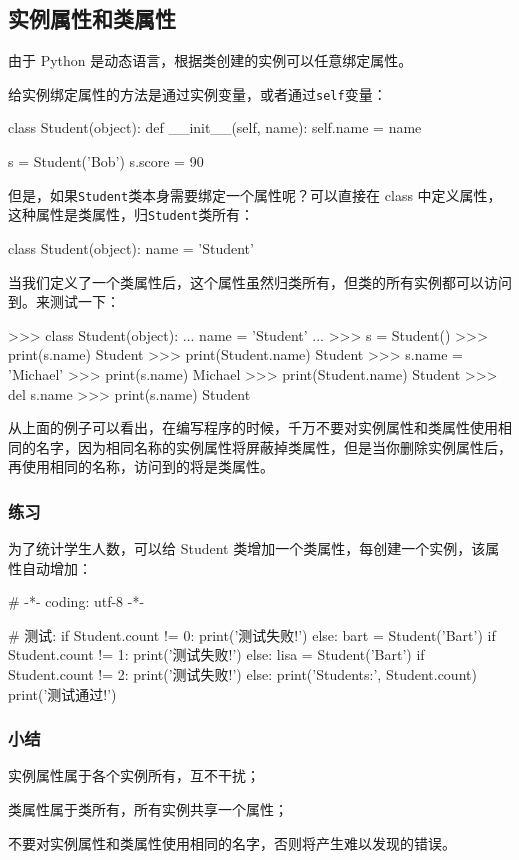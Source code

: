 \hypertarget{ux5b9eux4f8bux5c5eux6027ux548cux7c7bux5c5eux6027}{%
\subsection{实例属性和类属性}\label{ux5b9eux4f8bux5c5eux6027ux548cux7c7bux5c5eux6027}}

由于 Python 是动态语言，根据类创建的实例可以任意绑定属性。

给实例绑定属性的方法是通过实例变量，或者通过\texttt{self}变量：

\begin{pythoncode}
class Student(object):
    def __init__(self, name):
        self.name = name

s = Student('Bob')
s.score = 90
\end{pythoncode}

但是，如果\texttt{Student}类本身需要绑定一个属性呢？可以直接在 class
中定义属性，这种属性是类属性，归\texttt{Student}类所有：

\begin{pythoncode}
class Student(object):
    name = 'Student'
\end{pythoncode}

当我们定义了一个类属性后，这个属性虽然归类所有，但类的所有实例都可以访问到。来测试一下：

\begin{pythoncode}
>>> class Student(object):
...     name = 'Student'
...
>>> s = Student() 
>>> print(s.name) 
Student
>>> print(Student.name) 
Student
>>> s.name = 'Michael' 
>>> print(s.name) 
Michael
>>> print(Student.name) 
Student
>>> del s.name 
>>> print(s.name) 
Student
\end{pythoncode}

从上面的例子可以看出，在编写程序的时候，千万不要对实例属性和类属性使用相同的名字，因为相同名称的实例属性将屏蔽掉类属性，但是当你删除实例属性后，再使用相同的名称，访问到的将是类属性。

\hypertarget{ux7ec3ux4e60}{%
\subsubsection{练习}\label{ux7ec3ux4e60}}

为了统计学生人数，可以给 Student
类增加一个类属性，每创建一个实例，该属性自动增加：

\begin{pythoncode}
# -*- coding: utf-8 -*-
\end{pythoncode}

\begin{pythoncode}
# 测试:
if Student.count != 0:
    print('测试失败!')
else:
    bart = Student('Bart')
    if Student.count != 1:
        print('测试失败!')
    else:
        lisa = Student('Bart')
        if Student.count != 2:
            print('测试失败!')
        else:
            print('Students:', Student.count)
            print('测试通过!')
\end{pythoncode}

\hypertarget{ux5c0fux7ed3}{%
\subsubsection{小结}\label{ux5c0fux7ed3}}

实例属性属于各个实例所有，互不干扰；

类属性属于类所有，所有实例共享一个属性；

不要对实例属性和类属性使用相同的名字，否则将产生难以发现的错误。

